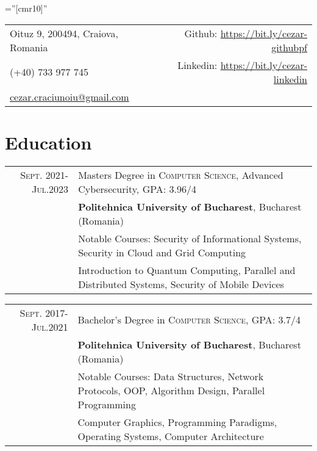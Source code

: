 \documentclass[a4paper,10pt]{article}
\begin{document}
\pagestyle{empty}    %
\font\fb=''[cmr10]'' %


\begin{tabular}{lr}
    \footnotesize{Oituz 9, 200494, Craiova, Romania \hspace{225pt}} & \footnotesize{Github: \url{https://bit.ly/cezar-githubpf}} \\
    \footnotesize{(+40) 733 977 745} & \footnotesize{Linkedin: \url{https://bit.ly/cezar-linkedin}} \\
    \footnotesize{\href{mailto:cezar.craciunoiu@gmail.com}{cezar.craciunoiu@gmail.com}} \\
\end{tabular}

\par{\bigskip\par}

\section{Education}
\begin{tabular}{rl}
	\textsc{Sept.} 2021-\textsc{Jul.}2023& Masters Degree in \textsc{Computer Science}, Advanced Cybersecurity, GPA: 3.96/4 \\&
	\normalsize\textbf{Politehnica University of Bucharest}, Bucharest (Romania) \\&
	\footnotesize{Notable Courses: Security of Informational Systems, Security in Cloud and Grid Computing} \\&
	\footnotesize{Introduction to Quantum Computing, Parallel and Distributed Systems, Security of Mobile Devices}
\end{tabular}

\begin{tabular}{rl}
	\textsc{Sept.} 2017-\textsc{Jul.}2021& Bachelor's Degree in \textsc{Computer Science}, GPA: 3.7/4 \\&
	\normalsize\textbf{Politehnica University of Bucharest}, Bucharest (Romania)\\&
	\footnotesize{Notable Courses: Data Structures, Network Protocols, OOP, Algorithm Design, Parallel Programming} \\&
	\footnotesize{Computer Graphics, Programming Paradigms, Operating Systems, Computer Architecture}
\end{tabular}
\end{document}

